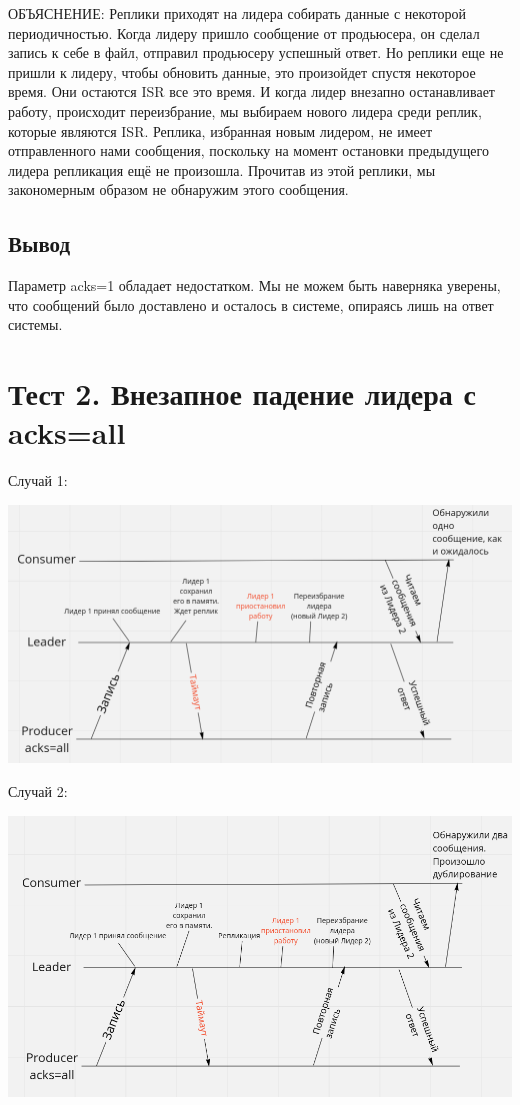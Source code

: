 \documentclass[11pt]{article}
\begin{document}
    ОБЪЯСНЕНИЕ: Реплики приходят на лидера собирать данные с некоторой периодичностью. Когда лидеру пришло сообщение
    от продьюсера, он сделал запись к себе в файл, отправил продьюсеру успешный ответ. Но реплики еще не пришли к
    лидеру, чтобы обновить данные, это произойдет спустя некоторое время. Они остаются ISR все это время. И
    когда лидер внезапно останавливает работу, происходит переизбрание, мы выбираем нового лидера среди реплик, которые
    являются ISR. Реплика, избранная новым лидером, не имеет отправленного нами сообщения, поскольку на момент
    остановки предыдущего лидера репликация ещё не произошла. Прочитав из этой реплики, мы закономерным образом не
    обнаружим этого сообщения.

    \subsection{Вывод}
    Параметр acks=1 обладает недостатком. Мы не можем быть наверняка уверены, что сообщений было доставлено и
    осталось в системе, опираясь лишь на ответ системы.
    

    \section{Тест 2. Внезапное падение лидера с acks=all}
    Случай 1:

    \includegraphics[width=15cm]{test2}

    Случай 2:

    \includegraphics[width=15cm]{test22}
\end{document}
